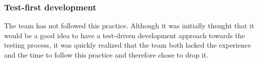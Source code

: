 \subsubsection{Test-first development}
The team has not followed this practice. Although it was initially thought that it would be a good idea to have a test-driven development approach towards the testing process, it was quickly realized that the team both lacked the experience and the time to follow this practice and therefore chose to drop it.


